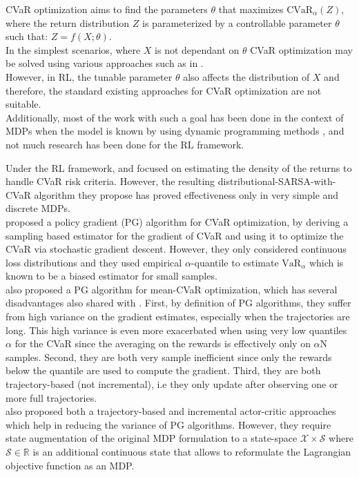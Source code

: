 CVaR optimization aims to find the parameters $\theta$ that maximizes 
$\text{CVaR}_\alpha (Z)$, where the return distribution $Z$ is parameterized by a 
controllable parameter $\theta$ such that: $Z = f(X; \theta)$.\\
In the simplest scenarios, where $X$ is not dependant on $\theta$ CVaR optimization may 
be solved using various approaches such as in \citet{Rockafellar2000}.\\
However, in RL, the tunable parameter $\theta$ also affects the 
distribution of $X$ and therefore, the standard existing approaches for CVaR optimization 
are not suitable.\\
Additionally, most of the work with such a goal has been done in the context of MDPs when
the model is known  by using dynamic programming methods \citep{Chow2015, Petrik2012},
and not much research has been done for the RL framework.

Under the RL framework, \citet{Morimura2010a} and \citet{Morimura2010b}
focused on estimating the density of the returns
to handle CVaR risk criteria. However, the resulting distributional-SARSA-with-CVaR algorithm
they propose has  proved  effectiveness  only  in  very  simple  and discrete MDPs.\\
\citet{Tamar2015a} proposed a policy gradient (PG) algorithm for CVaR optimization, by
deriving a sampling based estimator for the gradient of CVaR and using it to optimize the
CVaR via stochastic gradient descent. However, they only considered continuous loss distributions
and they used empirical $\alpha$-quantile to estimate 
$\text{VaR}_\alpha$ which is known to be a biased estimator for small samples.\\
\citet{Chow2014} also proposed a PG algorithm for mean-CVaR optimization, which has several
disadvantages also shared with \citet{Tamar2015}. First, by definition of PG algorithms,
they suffer from high variance on the gradient estimates, especially when the trajectories
are long. This high variance is even more exacerbated when using very low quantiles $\alpha$ for the CVaR 
since the averaging on the rewards is effectively only on $\alpha$N samples.
Second, they are both very sample inefficient since only the rewards below the quantile
are used to compute the gradient. Third, they are both trajectory-based (not incremental), 
i.e they only update after observing one or more full trajectories.\\
\citet{Chow2014} also proposed both a trajectory-based and incremental actor-critic
approaches which help in reducing the variance of PG algorithms. However, they require
state augmentation of the original MDP formulation to a state-space
$\mathcal{X} \times \mathcal{S}$ where $\mathcal{S} \in \mathbb R$ is an additional continuous
state that allows to reformulate the Lagrangian objective function as an MDP.

